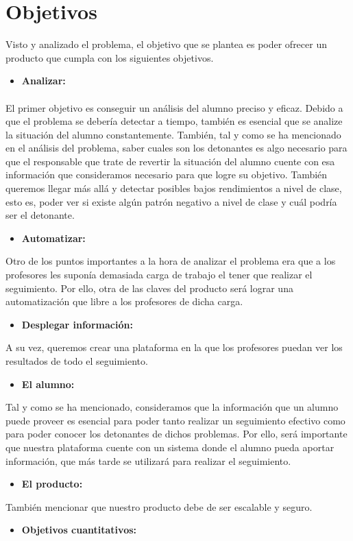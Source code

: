 \section{Objetivos}

Visto y analizado el problema, el objetivo que se plantea es poder ofrecer un producto que cumpla con los siguientes objetivos.
\begin{itemize}
\item{\textbf{Analizar:}}
\end{itemize}
\paragraph{}
El primer objetivo es conseguir un análisis del alumno preciso y eficaz. Debido a que el problema se debería detectar a tiempo, también es esencial que se analize la situación del alumno constantemente. También, tal y como se ha mencionado en el análisis del problema, saber cuales son los detonantes es algo necesario para que el responsable que trate de revertir la situación del alumno cuente con esa información que consideramos necesario para que logre su objetivo. También queremos llegar más allá y detectar posibles bajos rendimientos a nivel de clase, esto es, poder ver si existe algún patrón negativo a nivel de clase y cuál podría ser el detonante. 
\begin{itemize}
\item{\textbf{Automatizar:}}
\end{itemize}
Otro de los puntos importantes a la hora de analizar el problema era que a los profesores les suponía demasiada carga de trabajo el tener que realizar el seguimiento. Por ello, otra de las claves del producto será lograr una automatización que libre a los profesores de dicha carga.
\begin{itemize}
\item{\textbf{Desplegar información:}}
\end{itemize}
A su vez, queremos crear una plataforma en la que los profesores puedan ver los resultados de todo el seguimiento.
\begin{itemize}
\item{\textbf{El alumno:}}
\end{itemize}
Tal y como se ha mencionado, consideramos que la información que un alumno puede proveer es esencial para poder tanto realizar un seguimiento efectivo como para poder conocer los detonantes de dichos problemas. Por ello, será importante que nuestra plataforma cuente con un sistema donde el alumno pueda aportar información, que más tarde se utilizará para realizar el seguimiento.
\begin{itemize}
\item{\textbf{El producto:}}
\end{itemize}
También mencionar que nuestro producto debe de ser escalable y seguro. 
\begin{itemize}
\item{\textbf{Objetivos cuantitativos:}}
\end{itemize}
